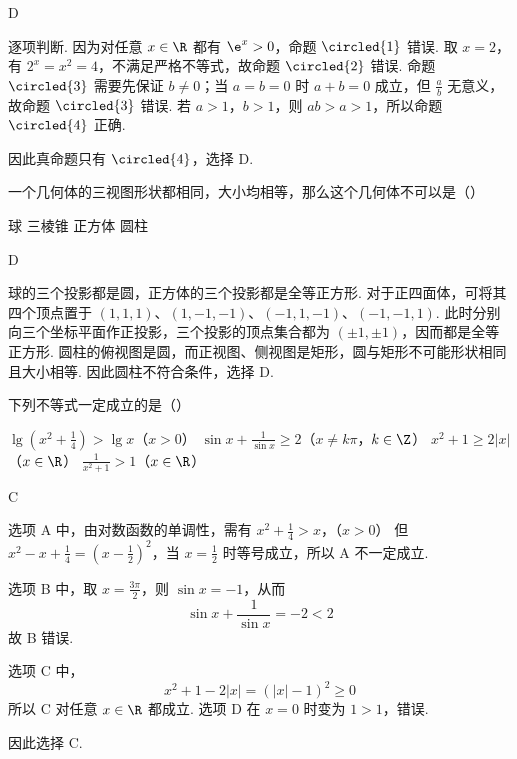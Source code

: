 \begin{answer}
D
\end{answer}

\begin{solution}
逐项判断. 因为对任意 \(x\in\R\) 都有 \(\e^{x}>0\)，命题 \(\circled{1}\) 错误. 取 \(x=2\)，有 \(2^{x}=x^{2}=4\)，不满足严格不等式，故命题 \(\circled{2}\) 错误. 命题 \(\circled{3}\) 需要先保证 \(b\neq0\)；当 \(a=b=0\) 时 \(a+b=0\) 成立，但 \(\frac{a}{b}\) 无意义，故命题 \(\circled{3}\) 错误. 若 \(a>1\)，\(b>1\)，则 \(ab>a>1\)，所以命题 \(\circled{4}\) 正确.

因此真命题只有 \(\circled{4}\)，选择 D.
\end{solution}

\begin{problem}
一个几何体的三视图形状都相同，大小均相等，那么这个几何体不可以是（\quad）

\choices
    {球}
    {三棱锥}
    {正方体}
    {圆柱}
\end{problem}

\begin{answer}
D
\end{answer}

\begin{solution}
球的三个投影都是圆，正方体的三个投影都是全等正方形. 对于正四面体，可将其四个顶点置于
\((1,1,1)\)、\((1,-1,-1)\)、\((-1,1,-1)\)、\((-1,-1,1)\). 此时分别向三个坐标平面作正投影，三个投影的顶点集合都为 \((\pm1,\pm1)\)，因而都是全等正方形. 圆柱的俯视图是圆，而正视图、侧视图是矩形，圆与矩形不可能形状相同且大小相等. 因此圆柱不符合条件，选择 D.
\end{solution}

\begin{problem}
下列不等式一定成立的是（\quad）

\choices
    {\(\lg\left(x^{2}+\frac{1}{4}\right) > \lg x\)（\(x > 0\)）}
    {\(\sin x + \frac{1}{\sin x} \geqslant 2\)（\(x \neq k\pi\)，\(k \in \Z\)）}
    {\(x^{2} + 1 \geqslant 2|x|\)（\(x \in \R\)）}
    {\(\frac{1}{x^{2} + 1} > 1\)（\(x \in \R\)）}
\end{problem}

\begin{answer}
C
\end{answer}

\begin{solution}
选项 A 中，由对数函数的单调性，需有
\(x^{2}+\frac14>x\)，（\(x>0\)）
但 \(x^{2}-x+\frac14=(x-\frac12)^{2}\)，当 \(x=\frac12\) 时等号成立，所以 A 不一定成立.

选项 B 中，取 \(x=\frac{3\pi}{2}\)，则 \(\sin x=-1\)，从而
\[
\sin x+\frac{1}{\sin x}=-2<2
\]
故 B 错误.

选项 C 中，
\[
x^{2}+1-2|x|=(|x|-1)^{2}\geqslant0
\]
所以 C 对任意 \(x\in\R\) 都成立. 选项 D 在 \(x=0\) 时变为 \(1>1\)，错误.

因此选择 C.
\end{solution}

